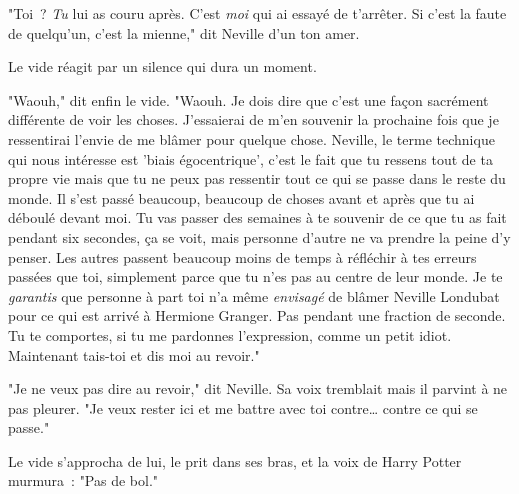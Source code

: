 "Toi~? \emph{Tu} lui as couru après. C'est \emph{moi} qui ai essayé de t'arrêter. Si c'est la faute de quelqu'un, c'est la mienne," dit Neville d'un ton amer.

Le vide réagit par un silence qui dura un moment.

"Waouh," dit enfin le vide. "Waouh. Je dois dire que c'est une façon sacrément différente de voir les choses. J'essaierai de m'en souvenir la prochaine fois que je ressentirai l'envie de me blâmer pour quelque chose. Neville, le terme technique qui nous intéresse est 'biais égocentrique', c'est le fait que tu ressens tout de ta propre vie mais que tu ne peux pas ressentir tout ce qui se passe dans le reste du monde. Il s'est passé beaucoup, beaucoup de choses avant et après que tu ai déboulé devant moi. Tu vas passer des semaines à te souvenir de ce que tu as fait pendant six secondes, ça se voit, mais personne d'autre ne va prendre la peine d'y penser. Les autres passent beaucoup moins de temps à réfléchir à tes erreurs passées que toi, simplement parce que tu n'es pas au centre de leur monde. Je te \emph{garantis} que personne à part toi n'a même \emph{envisagé} de blâmer Neville Londubat pour ce qui est arrivé à Hermione Granger. Pas pendant une fraction de seconde. Tu te comportes, si tu me pardonnes l'expression, comme un petit idiot. Maintenant tais-toi et dis moi au revoir."

"Je ne veux pas dire au revoir," dit Neville. Sa voix tremblait mais il parvint à ne pas pleurer. "Je veux rester ici et me battre avec toi contre… contre ce qui se passe."

Le vide s'approcha de lui, le prit dans ses bras, et la voix de Harry Potter murmura~: "Pas de bol." 

